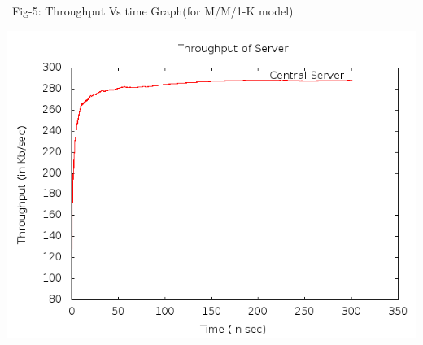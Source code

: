 \documentclass[a4paper,12pt]{report}
\begin{document}
\noindent \\\\\\\\\\\\\\\\\\\\\
\noindent Fig-5: Throughput Vs time Graph(for M/M/1-K model)
\begin{center}
 \includegraphics[width=12 cm,height=12 cm]{../problem1/throughput.png}
\end{center}
\end{document}
